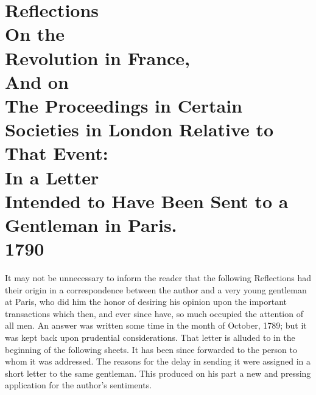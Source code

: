 


\chapter*[Reflections on the Revolution in France]{
Reflections
\\{\small On the}
\\Revolution in France,
\\{\small And on}
\\The Proceedings in Certain Societies in London Relative to That Event:
\\In a Letter
\\Intended to Have Been Sent to a Gentleman in Paris.
\\{\small 1790}
}

It may not be unnecessary to inform the reader that the following Reflections had their origin in a correspondence between the author and a very young gentleman at Paris, who did him the honor of desiring his opinion upon the important transactions which then, and ever since have, so much occupied the attention of all men. An answer was written some time in the month of October, 1789; but it was kept back upon prudential considerations. That letter is alluded to in the beginning of the following sheets. It has been since forwarded to the person to whom it was addressed. The reasons for the delay in sending it were assigned in a short letter to the same gentleman. This produced on his part a new and pressing application for the author's sentiments.

